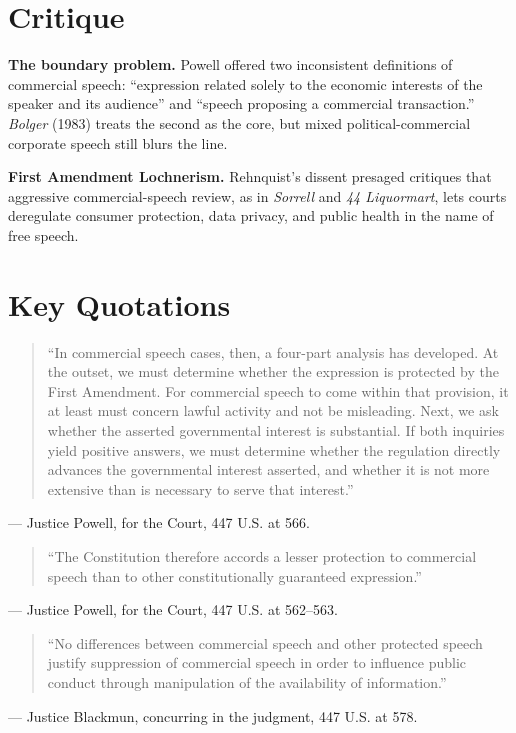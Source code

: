 \documentclass[12pt]{article}
\begin{document}
\section{Critique}

\textbf{The boundary problem.} Powell offered two inconsistent definitions of commercial speech: ``expression related solely to the economic interests of the speaker and its audience'' and ``speech proposing a commercial transaction.'' \textit{Bolger} (1983) treats the second as the core, but mixed political-commercial corporate speech still blurs the line.

\textbf{First Amendment Lochnerism.} Rehnquist's dissent presaged critiques that aggressive commercial-speech review, as in \textit{Sorrell} and \textit{44 Liquormart}, lets courts deregulate consumer protection, data privacy, and public health in the name of free speech.

\section{Key Quotations}

\begin{quote}
``In commercial speech cases, then, a four-part analysis has developed. At the outset, we must determine whether the expression is protected by the First Amendment. For commercial speech to come within that provision, it at least must concern lawful activity and not be misleading. Next, we ask whether the asserted governmental interest is substantial. If both inquiries yield positive answers, we must determine whether the regulation directly advances the governmental interest asserted, and whether it is not more extensive than is necessary to serve that interest.''
\end{quote}
\noindent --- Justice Powell, for the Court, 447 U.S. at 566.

\begin{quote}
``The Constitution therefore accords a lesser protection to commercial speech than to other constitutionally guaranteed expression.''
\end{quote}
\noindent --- Justice Powell, for the Court, 447 U.S. at 562--563.

\begin{quote}
``No differences between commercial speech and other protected speech justify suppression of commercial speech in order to influence public conduct through manipulation of the availability of information.''
\end{quote}
\noindent --- Justice Blackmun, concurring in the judgment, 447 U.S. at 578.
\end{document}
